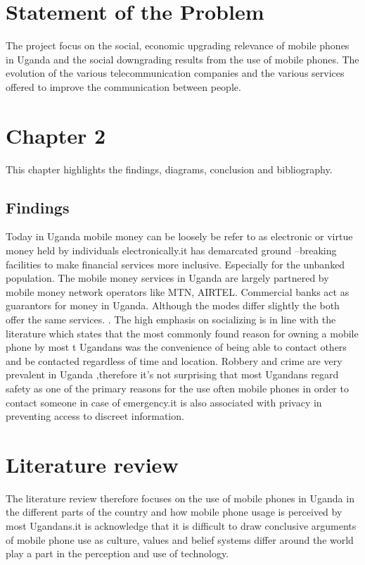 \documentclass[12]{article}
\begin{document}
\section{Statement of the Problem}
The project focus on the social, economic upgrading relevance of mobile phones in Uganda and the social downgrading results from the use of mobile phones. The evolution of the various telecommunication companies and the various services offered to improve the communication between people.

\section{Chapter 2}
This chapter highlights the findings, diagrams, conclusion and bibliography.
\subsection{Findings }
Today in Uganda mobile money can be loosely be refer to as electronic or virtue money held by individuals electronically.it has demarcated ground –breaking facilities to make financial services more inclusive. Especially for the unbanked population. The mobile money services in Uganda are largely partnered by mobile money network operators like MTN, AIRTEL. Commercial banks act as guarantors for money in Uganda. Although the modes differ slightly the both offer the same services. . The high emphasis on socializing is in line with the literature which states that the most commonly found reason for owning a mobile phone by most t Ugandans was the convenience of being able to contact others and be contacted regardless of time and location. Robbery and crime are very prevalent in Uganda ,therefore it’s not surprising that most Ugandans regard safety as one of the primary reasons for the use often mobile phones in order to contact someone in case of emergency.it is also associated with privacy in preventing access to discreet information.

\section{Literature review}
The literature review therefore focuses on the use of mobile phones in Uganda in the different parts of the country and how mobile phone usage is perceived by most Ugandans.it is acknowledge that it is difficult to draw conclusive arguments of mobile phone use as culture, values and belief systems differ around the world play a part in the perception and use of technology.
\end{document}
